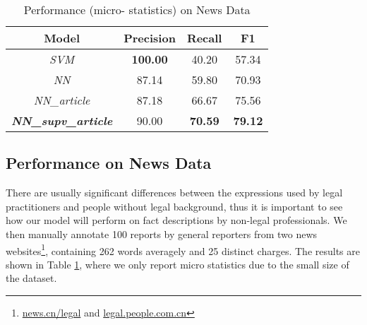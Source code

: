 \begin{table}
\centering
\small{
\begin{tabular}{|c|c|c|c|}
\hline
\textbf{Model}												& \textbf{Precision} 				& \textbf{Recall} 				& \textbf{F1} 	\\
\hline
\textit{SVM} 													& \textbf{100.00}						& 40.20  									& 57.34 				 	\\
\hline
\textit{NN}														& 87.14											& 59.80 									& 70.93					\\
\hline
\textit{NN\_article}					& 87.18											& 66.67 									& 75.56					\\
\hline
\textbf{\textit{NN\_supv\_article}} 	& 90.00 										& \textbf{70.59} 					& \textbf{79.12} 		 	\\
\hline
\end{tabular}
}
\caption{Performance (micro- statistics) on News Data}
\label{tabble_news_results}
\end{table}

\subsection{Performance on News Data}
There are usually significant differences between the expressions used by legal practitioners and people without legal background, 
thus it is important to see how our model  will perform on fact descriptions by non-legal professionals. 
%
We then manually annotate 100 reports by general reporters 
from two news websites\footnote{\url{news.cn/legal} and \url{legal.people.com.cn}}, 
containing 262 words averagely and 25 distinct charges.
%
The results are shown in Table \ref{tabble_news_results}, where we only report micro statistics due to the small size of the dataset.

